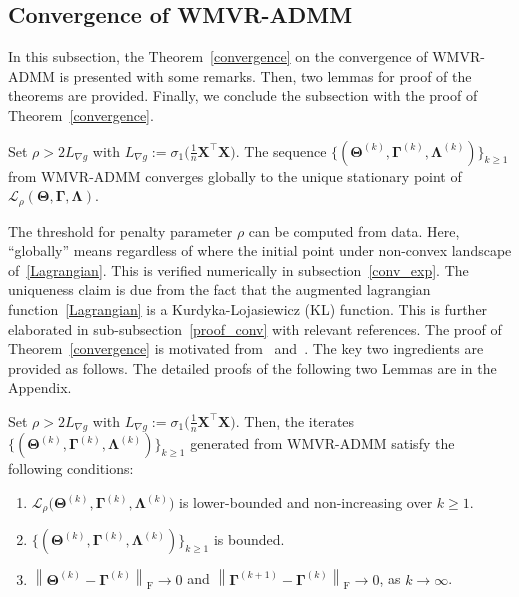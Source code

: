 \documentclass[alpha-refs]{wiley-article}
\begin{document}
\subsection{Convergence of WMVR-ADMM}
In this subsection, the Theorem~\ref{convergence} on the convergence of WMVR-ADMM is presented with some remarks.
Then, two lemmas for proof of the theorems are provided.
Finally, we conclude the subsection with the proof of Theorem~\ref{convergence}.

\begin{theorem} \label{convergence}
    Set $\rho>2L_{\nabla g}$ with $L_{\nabla g}:=\sigma_{1}\big( \frac{1}{n}\boldsymbol{X}^{\top}\boldsymbol{X}\big)$.
    The sequence $\{(\boldsymbol{\Theta}^{(k)},\boldsymbol{\Gamma}^{(k)},\boldsymbol{\Lambda}^{(k)})\}_{k \geq 1}$ from WMVR-ADMM converges globally to the unique stationary point of $\mathcal{L}_{\rho}(\boldsymbol{\Theta},\boldsymbol{\Gamma},\boldsymbol{\Lambda})$.
\end{theorem}

The threshold for penalty parameter $\rho$ can be computed from data.
Here, ``globally'' means regardless of where the initial point under non-convex landscape of~\eqref{Lagrangian}.
This is verified numerically in subsection~\ref{conv_exp}.
The uniqueness claim is due from the fact that the augmented lagrangian function~\eqref{Lagrangian} is a Kurdyka-Lojasiewicz (KL) function.
This is further elaborated in sub-subsection~\ref{proof_conv} with relevant references.
The proof of Theorem~\ref{convergence} is motivated from~\citet{wang2019global} and~\citet{kim2020cauchy}.
The key two ingredients are provided as follows.
The detailed proofs of the following two Lemmas are in the Appendix.
\begin{lemma} \label{Lemma2.3}
Set $\rho>2L_{\nabla g}$ with $L_{\nabla g}:=\sigma_{1}\big( \frac{1}{n}\boldsymbol{X}^{\top}\boldsymbol{X}\big)$.
Then, the iterates $\{(\boldsymbol{\Theta}^{(k)},\boldsymbol{\Gamma}^{(k)},\boldsymbol{\Lambda}^{(k)})\}_{k \geq 1}$ generated from WMVR-ADMM satisfy the following conditions:
\begin{enumerate}
    \item $\mathcal{L}_{\rho} \big( \boldsymbol{\Theta}^{(k)},\boldsymbol{\Gamma}^{(k)},\boldsymbol{\Lambda}^{(k)} \big)$ is lower-bounded and non-increasing over $k \geq 1$.
    \item $\{(\boldsymbol{\Theta}^{(k)},\boldsymbol{\Gamma}^{(k)},\boldsymbol{\Lambda}^{(k)})\}_{k \geq 1}$ is bounded.
    \item $\left\| \boldsymbol{\Theta}^{(k)} - \boldsymbol{\Gamma}^{(k)} \right\|_{\text{F}}\rightarrow{0}$ \quad and
    \quad $\left\| \boldsymbol{\Gamma}^{(k+1)} - \boldsymbol{\Gamma}^{(k)} \right\|_{\text{F}}\rightarrow{0}$, \quad as
    $k\rightarrow{\infty}$.
\end{enumerate}
\end{lemma}
\end{document}
